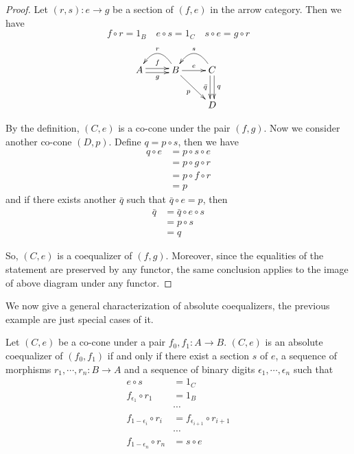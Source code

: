   \begin{proof}
    Let $(r,s)\colon e\to g$ be a section of $(f,e)$ in the arrow category. Then we have
    \begin{equation*}
      f\circ r=1_B\quad e\circ s=1_C\quad s\circ e=g\circ r
    \end{equation*}
    \begin{displaymath}
    \xymatrix{
      A\ar@<0.5ex>[r]^{f}\ar@<-0.5ex>[r]_{g}
      &B\ar[r]^{e}\ar@/_1.5pc/[l]_{r}\ar[dr]_-{p}
      &C\ar@/_1.5pc/[l]_{s}\ar@<0.5ex>[d]^-{q}\ar@<-0.5ex>[d]_-{\bar{q}}\\
      &&D
    }
    \end{displaymath}

    By the definition, $(C,e)$ is a co-cone under the pair $(f,g)$. Now we consider another co-cone $(D,p)$. Define $q=p\circ s$, then we have
    \begin{align*}
      q\circ e & = p\circ s\circ e \\
       & = p\circ g\circ r \\
       & = p\circ f\circ r \\
       & = p
    \end{align*}
    and if there exists another $\bar{q}$ such that $\bar{q}\circ e = p$, then
    \begin{align*}
      \bar{q} & = \bar{q}\circ e\circ s \\
       & = p\circ s\\
       & = q
    \end{align*}

    So, $(C,e)$ is a coequalizer of $(f,g)$. Moreover, since the equalities of the statement are preserved by any functor, the same conclusion applies to the image of above diagram under any functor.
  \end{proof}\label{prop:abs coeq}
  We now give a general characterization of absolute coequalizers, the previous example are just special cases of it.
  \begin{prop}
    Let $(C,e)$ be a co-cone under a pair $f_0,f_1\colon A\to B$. $(C,e)$ is an absolute coequalizer of $(f_0,f_1)$ if and only if there exist a section $s$ of $e$, a sequence of morphisms $r_1,\cdots,r_n\colon B\to A$ and a sequence of binary digits $\epsilon_1,\cdots,\epsilon_n$ such that
    \begin{align*}
      e\circ s & = 1_C \\
      f_{\epsilon_1}\circ r_1 & = 1_B\\
      &\cdots\\
      f_{1-\epsilon_i}\circ r_i & = f_{\epsilon_{i+1}}\circ r_{i+1}\\
      &\cdots\\
      f_{1-\epsilon_n}\circ r_n & = s\circ e
    \end{align*}
  \end{prop}
